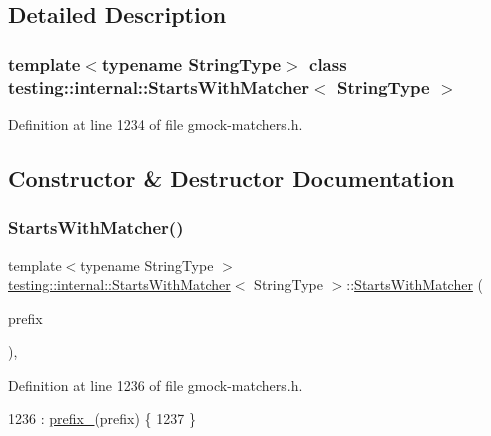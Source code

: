 \subsection{Detailed Description}
\subsubsection*{template$<$typename String\+Type$>$\newline
class testing\+::internal\+::\+Starts\+With\+Matcher$<$ String\+Type $>$}



Definition at line 1234 of file gmock-\/matchers.\+h.



\subsection{Constructor \& Destructor Documentation}
\mbox{\label{classtesting_1_1internal_1_1StartsWithMatcher_ab06a2a2a4c506771f20754bdbf8742bc}} 
\subsubsection{\texorpdfstring{Starts\+With\+Matcher()}{StartsWithMatcher()}}
{\footnotesize\ttfamily template$<$typename String\+Type $>$ \\
\hyperlink{classtesting_1_1internal_1_1StartsWithMatcher}{testing\+::internal\+::\+Starts\+With\+Matcher}$<$ String\+Type $>$\+::\hyperlink{classtesting_1_1internal_1_1StartsWithMatcher}{Starts\+With\+Matcher} (\begin{DoxyParamCaption}\item[{const String\+Type \&}]{prefix }\end{DoxyParamCaption})\hspace{0.3cm}{\ttfamily [inline]}, {\ttfamily [explicit]}}



Definition at line 1236 of file gmock-\/matchers.\+h.


\begin{DoxyCode}
1236                                                        : \hyperlink{classtesting_1_1internal_1_1StartsWithMatcher_a9122de4c38f40c95f822fb8d290942f9}{prefix\_}(prefix) \{
1237   \}
\end{DoxyCode}


